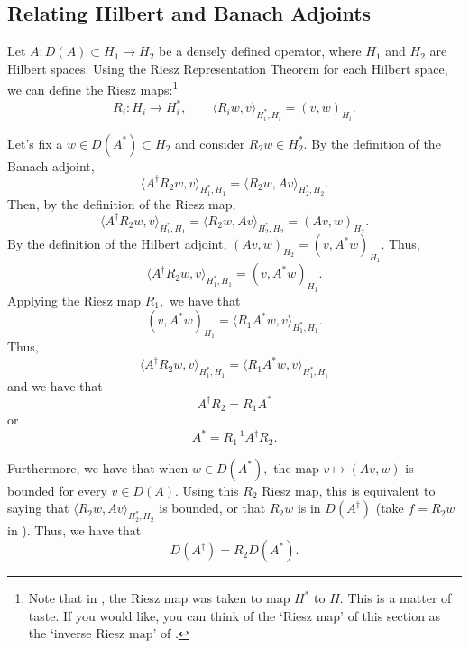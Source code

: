 \documentclass[12pt,a4paper]{article}
\theoremstyle{boldthm}
\theoremstyle{bolddefn}
\begin{document}
\subsection{Relating Hilbert and Banach Adjoints}

Let $A : D(A)\subset H_1 \rightarrow H_2$ be a densely defined operator, where $H_1$ and $H_2$ are Hilbert spaces. Using the Riesz Representation Theorem for each Hilbert space, we can define the Riesz maps:\footnote{Note that in , the Riesz map was taken to map $H^*$ to $H.$ This is a matter of taste. If you would like, you can think of the `Riesz map' of this section as the `inverse Riesz map' of .}
\begin{equation}
    R_i : H_i \rightarrow H_i^*, \qquad \langle R_i w, v \rangle_{H_i^*, H_i} = (v, w)_{H_i}.
\end{equation}

Let's fix a $w \in D(A^*) \subset H_2$ and consider $R_2 w \in H_2^*.$ By the definition of the Banach adjoint, 
\begin{equation}
    \langle A^\dagger R_2 w , v \rangle_{H_1^*, H_1} = \langle R_2 w, Av \rangle_{H_2^*, H_2}.
\end{equation}
Then, by the definition of the Riesz map,
\begin{equation}
    \langle A^\dagger R_2 w , v \rangle_{H_1^*, H_1} = \langle R_2 w, Av \rangle_{H_2^*, H_2} = (Av, w)_{H_2}.
\end{equation}
By the definition of the Hilbert adjoint,  $(Av, w)_{H_2} = (v, A^*w)_{H_1}.$ Thus, 
 \begin{equation}
    \langle A^\dagger R_2 w , v \rangle_{H_1^*, H_1} = (v, A^*w)_{H_1}.
\end{equation}
Applying the Riesz map $R_1,$ we have that
\begin{equation}
    (v, A^*w)_{H_1} = \langle R_1 A^* w, v \rangle_{H_1^*, H_1}. 
\end{equation}
Thus, 
\begin{equation}
     \langle A^\dagger R_2 w , v \rangle_{H_1^*, H_1} = \langle R_1 A^* w, v \rangle_{H_1^*, H_1}
\end{equation}
and we have that 
\begin{equation}
    A^\dagger R_2 = R_1 A^*
\end{equation}
or
\begin{equation}
    A^* = R_1^{-1} A^\dagger R_2.
\end{equation}

Furthermore, we have that when $w \in D(A^*),$ the map $v \mapsto (Av, w)$ is bounded for every $v \in D(A)$. Using this $R_2$ Riesz map, this is equivalent to saying that $\langle R_2 w, Av \rangle_{H_2^*, H_2}$ is bounded, or that $R_2 w$ is in $D(A^\dagger)$ (take $f = R_2 w$ in ). Thus, we have that
\begin{equation}
    D(A^\dagger) = R_2 D(A^*).
\end{equation}
\end{document}
